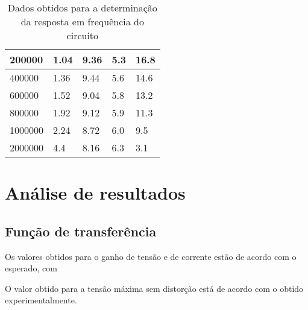 \documentclass[%
  reprint,
  nofootinbib,
  amsmath,amssymb,
  aps,
  10pt,
  a4paper
]{revtex4-1}
\begin{document}
\begin{table}[h]
\begin{tabular}{|l|l|l|l|l|}
    200000                           	    & 1.04  & 9.36&  5.3	&16.8			\\ \hline
    400000                           	    & 1.36  & 9.44&  5.6	&14.6				\\ \hline
    600000                           	    & 1.52  & 9.04&  5.8	&13.2				\\ \hline
    800000                           	    & 1.92  & 9.12&  5.9	&11.3				\\ \hline
    1000000                          	    & 2.24  & 8.72&  6.0	&9.5				\\ \hline
    2000000				    &4.4     &8.16 &  6.3     &3.1                          \\ \hline
    \end{tabular}
\caption{Dados obtidos para a determinação da resposta em frequência do circuito}
\label{tab:respostafrequencia}
\end{table}






\section{Análise de resultados}
\label{s:aresul}

\subsection{Função de transferência}

Os valores obtidos para o ganho de tensão e de corrente estão de acordo com o esperado, com 

O valor obtido para a tensão máxima sem distorção está de acordo com o obtido experimentalmente.
\end{document}

